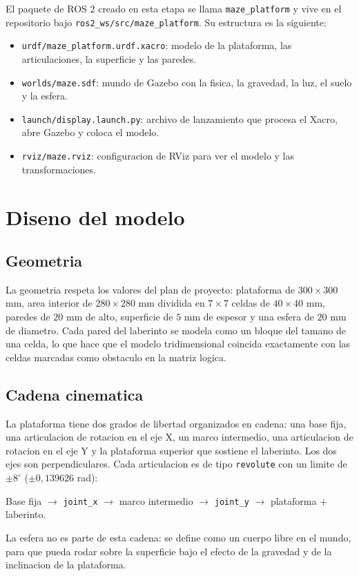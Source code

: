 \documentclass[11pt,a4paper]{article}
\begin{document}
El paquete de ROS 2 creado en esta etapa se llama \texttt{maze\_platform} y vive en el repositorio bajo \texttt{ros2\_ws/src/maze\_platform}. Su estructura es la siguiente:
\begin{itemize}
    \item \texttt{urdf/maze\_platform.urdf.xacro}: modelo de la plataforma, las articulaciones, la superficie y las paredes.
    \item \texttt{worlds/maze.sdf}: mundo de Gazebo con la fisica, la gravedad, la luz, el suelo y la esfera.
    \item \texttt{launch/display.launch.py}: archivo de lanzamiento que procesa el Xacro, abre Gazebo y coloca el modelo.
    \item \texttt{rviz/maze.rviz}: configuracion de RViz para ver el modelo y las transformaciones.
\end{itemize}

\section{Diseno del modelo}

\subsection{Geometria}
La geometria respeta los valores del plan de proyecto: plataforma de $300 \times 300$ mm, area interior de $280 \times 280$ mm dividida en $7 \times 7$ celdas de $40 \times 40$ mm, paredes de $20$ mm de alto, superficie de $5$ mm de espesor y una esfera de $20$ mm de diametro. Cada pared del laberinto se modela como un bloque del tamano de una celda, lo que hace que el modelo tridimensional coincida exactamente con las celdas marcadas como obstaculo en la matriz logica.

\subsection{Cadena cinematica}
La plataforma tiene dos grados de libertad organizados en cadena: una base fija, una articulacion de rotacion en el eje X, un marco intermedio, una articulacion de rotacion en el eje Y y la plataforma superior que sostiene el laberinto. Los dos ejes son perpendiculares. Cada articulacion es de tipo \texttt{revolute} con un limite de $\pm 8^\circ$ ($\pm 0{,}139626$ rad):
\begin{center}
Base fija $\rightarrow$ \texttt{joint\_x} $\rightarrow$ marco intermedio $\rightarrow$ \texttt{joint\_y} $\rightarrow$ plataforma + laberinto.
\end{center}
La esfera no es parte de esta cadena: se define como un cuerpo libre en el mundo, para que pueda rodar sobre la superficie bajo el efecto de la gravedad y de la inclinacion de la plataforma.
\end{document}
